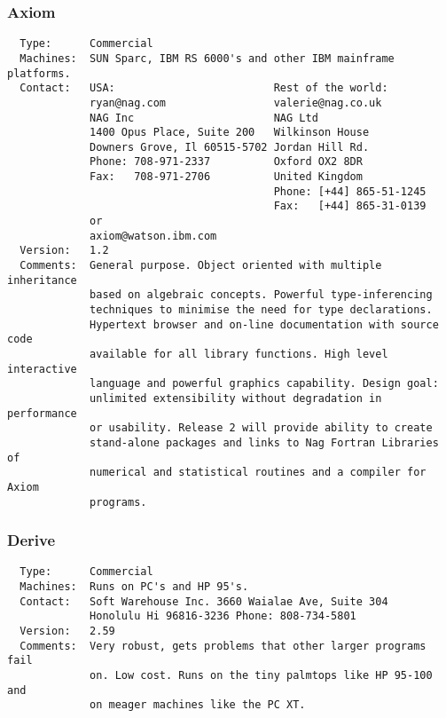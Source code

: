 \subsubsection{Axiom}
\begin{verbatim}
  Type:      Commercial
  Machines:  SUN Sparc, IBM RS 6000's and other IBM mainframe platforms.
  Contact:   USA:                         Rest of the world:
             ryan@nag.com                 valerie@nag.co.uk
             NAG Inc                      NAG Ltd
             1400 Opus Place, Suite 200   Wilkinson House
             Downers Grove, Il 60515-5702 Jordan Hill Rd.
             Phone: 708-971-2337          Oxford OX2 8DR
             Fax:   708-971-2706          United Kingdom
                                          Phone: [+44] 865-51-1245
                                          Fax:   [+44] 865-31-0139
             or
             axiom@watson.ibm.com
  Version:   1.2
  Comments:  General purpose. Object oriented with multiple inheritance
             based on algebraic concepts. Powerful type-inferencing
             techniques to minimise the need for type declarations.
             Hypertext browser and on-line documentation with source code
             available for all library functions. High level interactive
             language and powerful graphics capability. Design goal:
             unlimited extensibility without degradation in performance
             or usability. Release 2 will provide ability to create
             stand-alone packages and links to Nag Fortran Libraries of
             numerical and statistical routines and a compiler for Axiom
             programs.
\end{verbatim}

\newpage
\subsubsection{Derive}
\begin{verbatim}
  Type:      Commercial
  Machines:  Runs on PC's and HP 95's.
  Contact:   Soft Warehouse Inc. 3660 Waialae Ave, Suite 304
             Honolulu Hi 96816-3236 Phone: 808-734-5801
  Version:   2.59
  Comments:  Very robust, gets problems that other larger programs fail
             on. Low cost. Runs on the tiny palmtops like HP 95-100 and
             on meager machines like the PC XT.
\end{verbatim}


